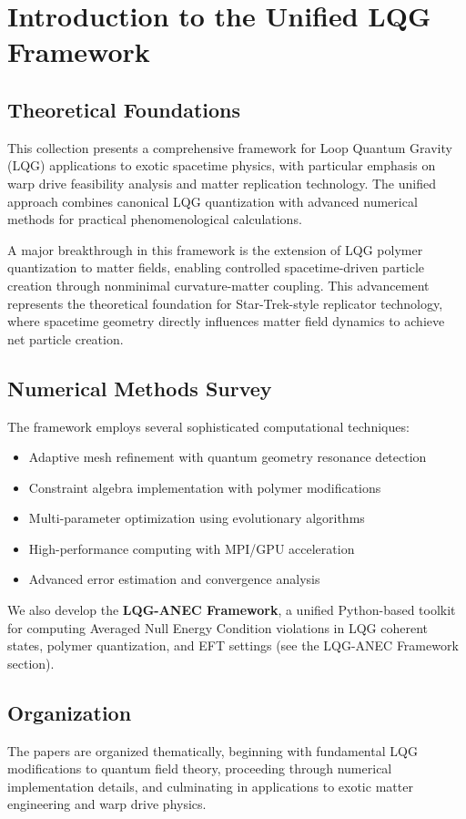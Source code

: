 \documentclass[11pt]{article}
\begin{document}
\section*{Introduction to the Unified LQG Framework}

\subsection*{Theoretical Foundations}
This collection presents a comprehensive framework for Loop Quantum Gravity (LQG) applications to exotic spacetime physics, with particular emphasis on warp drive feasibility analysis and matter replication technology. The unified approach combines canonical LQG quantization with advanced numerical methods for practical phenomenological calculations.

A major breakthrough in this framework is the extension of LQG polymer quantization to matter fields, enabling controlled spacetime-driven particle creation through nonminimal curvature-matter coupling. This advancement represents the theoretical foundation for Star-Trek-style replicator technology, where spacetime geometry directly influences matter field dynamics to achieve net particle creation.

\subsection*{Numerical Methods Survey}
The framework employs several sophisticated computational techniques:
\begin{itemize}
  \item Adaptive mesh refinement with quantum geometry resonance detection
  \item Constraint algebra implementation with polymer modifications
  \item Multi-parameter optimization using evolutionary algorithms
  \item High-performance computing with MPI/GPU acceleration
  \item Advanced error estimation and convergence analysis
\end{itemize}

We also develop the \textbf{LQG-ANEC Framework}, a unified Python-based toolkit for computing Averaged Null Energy Condition violations in LQG coherent states, polymer quantization, and EFT settings (see the LQG-ANEC Framework section).

\subsection*{Organization}
The papers are organized thematically, beginning with fundamental LQG modifications to quantum field theory, proceeding through numerical implementation details, and culminating in applications to exotic matter engineering and warp drive physics.
\end{document}
